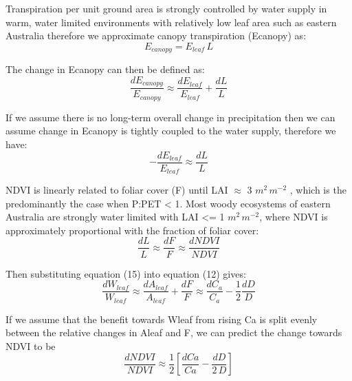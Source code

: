 \documentclass[gc, manuscript]{copernicus}
\begin{document}
Transpiration per unit ground area is strongly controlled by water
supply in warm, water limited environments with relatively low leaf area
such as eastern Australia \citep{spechtWaterUsePerennial1972} therefore
we approximate canopy transpiration (Ecanopy) as: \begin{equation}
E_{canopy}=E_{leaf}\,L
\end{equation}

The change in Ecanopy can then be defined as: \begin{equation}
\frac{dE_{canopy}}{E_{canopy}} \approx \frac{dE_{leaf}}{E_{leaf}}+\frac{dL}{L}
\end{equation}

If we assume there is no long-term overall change in precipitation then
we can assume change in Ecanopy is tightly coupled to the water supply,
therefore we have: \begin{equation}
-\frac{dE_{leaf}}{E_{leaf}} \approx \frac{dL}{L}
\end{equation}

NDVI is linearly related to foliar cover (F) until LAI \(\approx\) 3
\(m^2\,m^{-2}\) \citep{carlsonRelationNDVIFractional1997a}, which is the
predominantly the case when P:PET \textless{} 1. Most woody ecosystems
of eastern Australia are strongly water limited with LAI \textless= 1
\(m^2\,m^{-2}\), where NDVI is approximately proportional with the
fraction of foliar cover: \begin{equation}
\frac{dL}{L}\approx\frac{dF}{F}\approx\frac{d NDVI}{NDVI}
\end{equation}

Then substituting equation (15) into equation (12) gives:
\begin{equation}
\frac{dW_{leaf}}{W_{leaf}} \approx  \frac{dA_{leaf}}{A_{leaf}} + \frac{dF}{F} \approx \frac{dC_a}{C_a} - \frac{1}{2}\frac{dD}{D}
\end{equation}

If we assume that the benefit towards Wleaf from rising Ca is split
evenly between the relative changes in Aleaf and F, we can predict the
change towards NDVI to be \begin{equation}
\frac{dNDVI}{NDVI} \approx \frac{1}{2}[\frac{dCa}{Ca}-\frac{dD}{2\,D}]
\end{equation}
\end{document}
